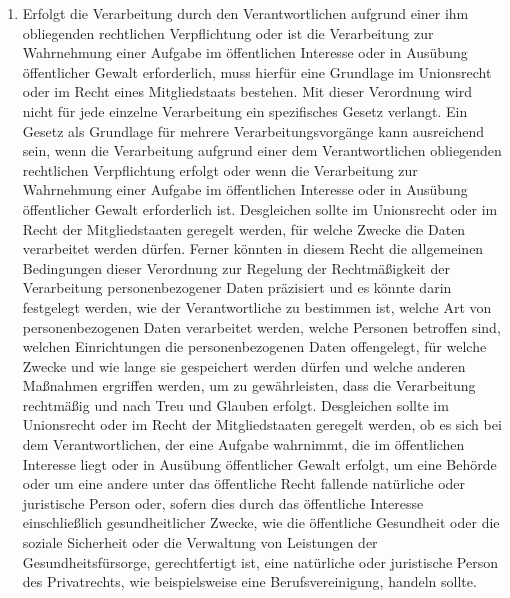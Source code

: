 \begin{enumerate}
   \item Erfolgt die Verarbeitung durch den Verantwortlichen aufgrund einer ihm obliegenden rechtlichen Verpflichtung
    oder ist die Verarbeitung zur Wahrnehmung einer Aufgabe im öffentlichen Interesse oder in Ausübung öffentlicher
    Gewalt erforderlich, muss hierfür eine Grundlage im Unionsrecht oder im Recht eines Mitgliedstaats bestehen. Mit
    dieser Verordnung wird nicht für jede einzelne Verarbeitung ein spezifisches Gesetz verlangt. Ein Gesetz als
    Grundlage für mehrere Verarbeitungsvorgänge kann ausreichend sein, wenn die Verarbeitung aufgrund einer dem
    Verantwortlichen obliegenden rechtlichen Verpflichtung erfolgt oder wenn die Verarbeitung zur Wahrnehmung einer
    Aufgabe im öffentlichen Interesse oder in Ausübung öffentlicher Gewalt erforderlich ist. Desgleichen sollte im
    Unionsrecht oder im Recht der Mitgliedstaaten geregelt werden, für welche Zwecke die Daten verarbeitet werden
    dürfen. Ferner könnten in diesem Recht die allgemeinen Bedingungen dieser Verordnung zur Regelung der
    Rechtmäßigkeit der Verarbeitung personenbezogener Daten präzisiert und es könnte darin festgelegt werden, wie der
    Verantwortliche zu bestimmen ist, welche Art von personenbezogenen Daten verarbeitet werden, welche Personen
    betroffen sind, welchen Einrichtungen die personenbezogenen Daten offengelegt, für welche Zwecke und wie lange sie
    gespeichert werden dürfen und welche anderen Maßnahmen ergriffen werden, um zu gewährleisten, dass die Verarbeitung
    rechtmäßig und nach Treu und Glauben erfolgt. Desgleichen sollte im Unionsrecht oder im Recht der Mitgliedstaaten
    geregelt werden, ob es sich bei dem Verantwortlichen, der eine Aufgabe wahrnimmt, die im öffentlichen Interesse
    liegt oder in Ausübung öffentlicher Gewalt erfolgt, um eine Behörde oder um eine andere unter das öffentliche Recht
    fallende natürliche oder juristische Person oder, sofern dies durch das öffentliche Interesse einschließlich
    gesundheitlicher Zwecke, wie die öffentliche Gesundheit oder die soziale Sicherheit oder die Verwaltung von
    Leistungen der Gesundheitsfürsorge, gerechtfertigt ist, eine natürliche oder juristische Person des Privatrechts,
    wie beispielsweise eine Berufsvereinigung, handeln sollte.%
   \label{itm:eg-45}
   


\end{enumerate}
